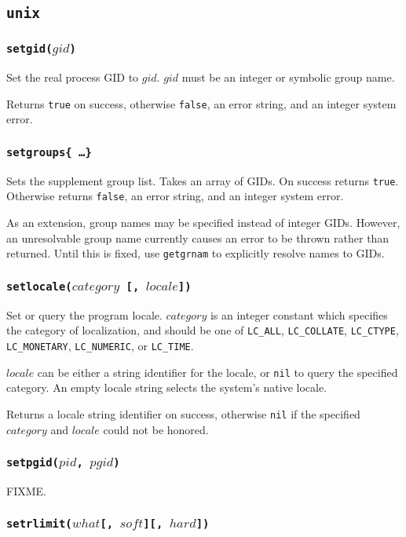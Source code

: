 \documentclass[11pt, oneside]{memoir}
\newcommand*{\true}[0]{\texttt{true}\xspace}
\newcommand*{\false}[0]{\texttt{false}\xspace}
\newcommand*{\nil}[0]{\texttt{nil}\xspace}
\newcommand*{\fn}[1]{\texttt{#1}\xspace}
\newcounter{toccols}
\newenvironment{Module}[1]{
	\subsection{\texttt{#1}}
	\addtocontents{toc}{
		\protect\begin{multicols}{\value{toccols}}
	}
}{
	\addtocontents{toc}{\protect\end{multicols}}
}
\begin{document}
\begin{Module}{unix}
\subsubsection[\fn{setgid}]{\fn{setgid($gid$)}}

Set the real process GID to $gid$. $gid$ must be an integer or symbolic group name.

Returns \true on success, otherwise \false, an error string, and an integer system error.

\subsubsection[\fn{setgroups}]{\fn{setgroups\{ \ldots \}}}

Sets the supplement group list. Takes an array of GIDs. On success returns \true. Otherwise returns \false, an error string, and an integer system error.

As an extension, group names may be specified instead of integer GIDs. However, an unresolvable group name currently causes an error to be thrown rather than returned. Until this is fixed, use \fn{getgrnam} to explicitly resolve names to GIDs.

\subsubsection[\fn{setlocale}]{\fn{setlocale($category$ [, $locale$])}}

Set or query the program locale. $category$ is an integer constant which specifies the category of localization, and should be one of \texttt{LC\_ALL}, \texttt{LC\_COLLATE}, \texttt{LC\_CTYPE}, \texttt{LC\_MONETARY}, \texttt{LC\_NUMERIC}, or \texttt{LC\_TIME}.

$locale$ can be either a string identifier for the locale, or \nil to query the specified category. An empty locale string selects the system's native locale.

Returns a locale string identifier on success, otherwise \nil if the specified $category$ and $locale$ could not be honored.

\subsubsection[\fn{setpgid}]{\fn{setpgid($pid$, $pgid$)}}

FIXME.

\subsubsection[\fn{setrlimit}]{\fn{setrlimit($what$[, $soft$][, $hard$])}}


\end{Module}
\end{document}
